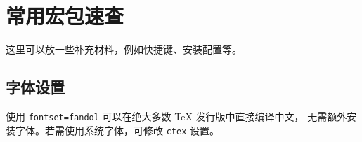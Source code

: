 \chapter{常用宏包速查}
这里可以放一些补充材料，例如快捷键、安装配置等。

\section{字体设置}
使用 \texttt{fontset=fandol} 可以在绝大多数 TeX 发行版中直接编译中文，
无需额外安装字体。若需使用系统字体，可修改 \texttt{ctex} 设置。